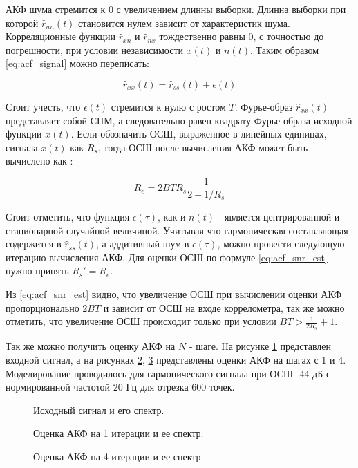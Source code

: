 АКФ шума стремится к 0 с увеличением длинны выборки. Длинна выборки при которой ${\hat{r}_{nn}(t)}$ становится нулем зависит от характеристик шума.
Корреляционные функции ${\hat{r}_{xn}}$ и ${\hat{r}_{nx}}$ тождественно равны 0, с точностью до погрешности, при условии независимости
${x(t)}$ и ${n(t)}$. Таким образом \ref{eq:acf_signal} можно переписать:
\begin{center}
\begin{equation}
	\label{eq:acf_rss_signal_new}
	\hat{r}_{xx}(t) = \hat{r}_{ss}(t) + \epsilon (t)
\end{equation}
\end{center}
Стоит учесть, что ${\epsilon (t)}$ стремится к нулю с ростом ${T}$. Фурье-образ ${\hat{r}_{xx}(t)}$
представляет собой СПМ, а следовательно равен квадрату Фурье-образа исходной функции ${x(t)}$.
Если обозначить ОСШ, выраженное в линейных единицах, сигнала ${x(t)}$ как ${R_s}$, тогда ОСШ после вычисления АКФ может быть вычислено
как \cite{book_max}:
\begin{center}
\begin{equation}
	\label{eq:acf_snr_est}
	R_e=2BTR_s \frac{1}{2+1/R_s}
\end{equation}
\end{center}

Стоит отметить, что функция ${\epsilon(\tau)}$, как и ${n(t)}$ - является центрированной и
стационарной случайной величиной.
Учитывая что гармоническая составляющая содержится в ${\hat{r}_{ss}(t)}$, а аддитивный шум в ${\epsilon(\tau)}$, можно провести
следующую итерацию вычисления АКФ. Для оценки ОСШ по формуле \ref{eq:acf_snr_est} нужно принять ${R_s' = R_e}$.

Из \ref{eq:acf_snr_est} видно, что увеличение ОСШ при вычислении оценки АКФ пропорционально ${2BT}$ и зависит от
ОСШ на входе коррелометра, так же можно отметить, что увеличение ОСШ происходит только при условии ${BT > \frac{1}{2R_s} + 1}$.

Так же можно получить оценку АКФ на ${N}$ - шаге. На рисунке \ref{pic:acf_0_iter} представлен входной сигнал, а на
рисунках \ref{pic:acf_1_iter}, \ref{pic:acf_4_iter} представлены оценки АКФ на шагах с 1 и 4.
Моделирование проводилось для гармонического сигнала при ОСШ -44 дБ с нормированной частотой 20 Гц для
отрезка 600 точек.

\begin{figure}[H]
	\center{}
	\caption{Исходный сигнал и его спектр.}
	\label{pic:acf_0_iter}
\end{figure}

\begin{figure}[H]
	\center{}
	\caption{Оценка АКФ на 1 итерации и ее спектр.}
	\label{pic:acf_1_iter}
\end{figure}

\begin{figure}[H]
	\center{}
	\caption{Оценка АКФ на 4 итерации и ее спектр.}
	\label{pic:acf_4_iter}
\end{figure}
